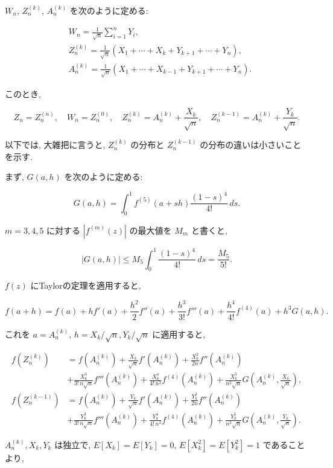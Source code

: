 \documentclass[10pt, a4paper,xelatex,ja=standard]{bxjsarticle}
\begin{document}
\(W_n\), \(Z_n^{(k)}\), \(A_n^{(k)}\) を次のように定める:

\[
\begin{aligned}
&
W_n = \frac{1}{\sqrt{n}} \sum_{i=1}^n Y_i,
\\ &
Z_n^{(k)} = \frac{1}{\sqrt{n}}(X_1+\cdots+X_k+Y_{k+1}+\cdots+Y_n),
\\ &
A_n^{(k)} = \frac{1}{\sqrt{n}}(X_1+\cdots+X_{k-1}+Y_{k+1}+\cdots+Y_n).
\end{aligned}
\]

このとき,

\[
Z_n = Z_n^{(n)}, \quad
W_n = Z_n^{(0)}, \quad
Z_n^{(k)} = A_n^{(k)} + \frac{X_k}{\sqrt{n}}, \quad
Z_n^{(k-1)} = A_n^{(k)} + \frac{Y_k}{\sqrt{n}}.
\]

以下では, 大雑把に言うと, \(Z_n^{(k)}\) の分布と \(Z_n^{(k-1)}\)
の分布の違いは小さいことを示す.

まず, \(G(a,h)\) を次のように定める:

\[
G(a, h) = \int_0^1 f^{(5)}(a + sh)\frac{(1-s)^4}{4!}\,ds.
\]

\(m=3,4,5\) に対する \(|f^{(m)}(z)|\) の最大値を \(M_m\) と書くと,

\[
|G(a,h)| \le M_5 \int_0^1 \frac{(1-s)^4}{4!}\,ds = \frac{M_5}{5!}.
\]

\(f(z)\) にTaylorの定理を適用すると,

\[
f(a+h) =
f(a) + h f'(a) + \frac{h^2}{2}f''(a) +
\frac{h^3}{3!}f'''(a) + \frac{h^4}{4!}f^{(4)}(a) +
h^3 G(a, h).
\]

これを \(a = A_n^{(k)}\), \(h = X_k/\sqrt{n}, Y_k/\sqrt{n}\)
に適用すると,

\[
\begin{aligned}
f(Z_n^{(k)}) &=
f(A_n^{(k)}) +
\frac{X_k}{\sqrt{n}} f'(A_n^{(k)}) + \frac{X_k^2}{2n}f''(A_n^{(k)}) 
\\ &+
\frac{X_k^3}{3!\,n\sqrt{n}}f'''(A_n^{(k)}) + \frac{X_k^4}{4!\,n^2}f^{(4)}(A_n^{(k)}) +
\frac{X_k^5}{n^2\sqrt{n}} G\left(A_n^{(k)}, \frac{X_k}{\sqrt{n}}\right),
\\
f(Z_n^{(k-1)}) &=
f(A_n^{(k)}) +
\frac{Y_k}{\sqrt{n}} f'(A_n^{(k)}) + \frac{Y_k^2}{2n}f''(A_n^{(k)}) 
\\ &+
\frac{Y_k^3}{3!\,n\sqrt{n}}f'''(A_n^{(k)}) + \frac{Y_k^4}{4!\,n^2}f^{(4)}(A_n^{(k)}) +
\frac{Y_k^5}{n^2\sqrt{n}} G\left(A_n^{(k)}, \frac{Y_k}{\sqrt{n}}\right).
\end{aligned}
\]

\(A_n^{(k)}, X_k, Y_k\) は独立で, \(E[X_k]=E[Y_k]=0\),
\(E[X_k^2]=E[Y_k^2]=1\) であることより,
\end{document}
